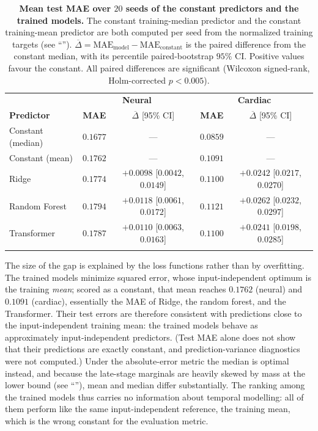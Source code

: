 \documentclass[10pt,letterpaper]{article}
\newlength\savedwidth
\newcommand\thickhline{\noalign{\global\savedwidth\arrayrulewidth\global\arrayrulewidth 2pt}%
\hline
\noalign{\global\arrayrulewidth\savedwidth}}
\begin{document}
\begin{table}[!ht]
\centering
\caption{\textbf{Mean test MAE over $20$ seeds of the constant predictors and the trained models.} The constant training-median predictor and the constant training-mean predictor are both computed per seed from the normalized training targets (see ``''). $\overline{\Delta}=\mathrm{MAE}_{\text{model}}-\mathrm{MAE}_{\text{constant}}$ is the paired difference from the constant median, with its percentile paired-bootstrap $95\%$ CI. Positive values favour the constant. All paired differences are significant (Wilcoxon signed-rank, Holm-corrected $p<0.005$).}
\label{tab:constant}
\begin{tabular}{lcccc}
\thickhline
 & \multicolumn{2}{c}{\textbf{Neural}} & \multicolumn{2}{c}{\textbf{Cardiac}} \\
\textbf{Predictor} & \textbf{MAE} & $\overline{\Delta}$ [95\% CI] & \textbf{MAE} & $\overline{\Delta}$ [95\% CI] \\
\thickhline
Constant (median) & $0.1677$ & --- & $0.0859$ & --- \\
\hline
Constant (mean) & $0.1762$ & --- & $0.1091$ & --- \\
\hline
Ridge & $0.1774$ & $+0.0098$ [$0.0042$, $0.0149$] & $0.1100$ & $+0.0242$ [$0.0217$, $0.0270$] \\
\hline
Random Forest & $0.1794$ & $+0.0118$ [$0.0061$, $0.0172$] & $0.1121$ & $+0.0262$ [$0.0232$, $0.0297$] \\
\hline
Transformer & $0.1787$ & $+0.0110$ [$0.0063$, $0.0163$] & $0.1100$ & $+0.0241$ [$0.0198$, $0.0285$] \\
\thickhline
\end{tabular}
\end{table}

The size of the gap is explained by the loss functions rather than by overfitting. The trained models minimize squared error, whose input-independent optimum is the training \emph{mean}; scored as a constant, that mean reaches $0.1762$ (neural) and $0.1091$ (cardiac), essentially the MAE of Ridge, the random forest, and the Transformer. Their test errors are therefore consistent with predictions close to the input-independent training mean: the trained models behave as approximately input-independent predictors. (Test MAE alone does not show that their predictions are exactly constant, and prediction-variance diagnostics were not computed.) Under the absolute-error metric the median is optimal instead, and because the late-stage marginals are heavily skewed by mass at the lower bound (see ``''), mean and median differ substantially. The ranking among the trained models thus carries no information about temporal modelling: all of them perform like the same input-independent reference, the training mean, which is the wrong constant for the evaluation metric.
\end{document}
